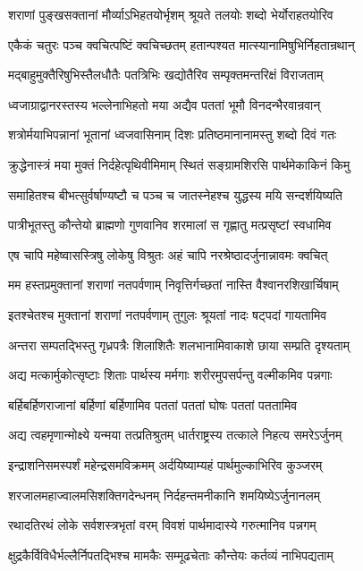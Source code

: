 \twolineshloka
{शराणां पुङ्खसक्तानां मौर्व्याऽभिहतयोर्भृशम्}
{श्रूयते तलयोः शब्दो भेर्योराहतयोरिव}


\twolineshloka
{एकैकं चतुरः पञ्च क्वचित्पष्टिं क्वचिच्छतम्}
{हतान्पश्यत मात्स्यानामिषुभिर्निहतान्रथान्}


\twolineshloka
{मद्बाहुमुक्तैरिषुभिस्तैलधौतैः पतत्रिभिः}
{खद्योतैरिव सम्पृक्तमन्तरिक्षं विराजताम्}


\twolineshloka
{ध्वजाग्राद्वानरस्तस्य भल्लेनाभिहतो मया}
{अद्यैव पततां भूमौ विनदन्भैरवान्रवान्}


\twolineshloka
{शत्रोर्मयाभिपन्नानां भूतानां ध्वजवासिनाम्}
{दिशः प्रतिष्ठमानानामस्तु शब्दो दिवं गतः}


\twolineshloka
{क्रुद्धेनास्त्रं मया मुक्तं निर्दहेत्पृथिवीमिमाम्}
{स्थितं सङ्ग्रामशिरसि पार्थमेकाकिनं किमु}


\twolineshloka
{समाहितश्च बीभत्सुर्वर्षाण्यष्टौ च पञ्च च}
{जातस्नेहश्च युद्धस्य मयि सन्दर्शयिष्यति}


\twolineshloka
{पात्रीभूतस्तु कौन्तेयो ब्राह्मणो गुणवानिव}
{शरमालां स गृह्णातु मत्प्रसृष्टां स्वधामिव}


\twolineshloka
{एष चापि महेष्वासस्त्रिषु लोकेषु विश्रुतः}
{अहं चापि नरश्रेष्ठादर्जुनान्नावमः क्वचित्}


\twolineshloka
{मम हस्तप्रमुक्तानां शराणां नतपर्वणाम्}
{निवृत्तिर्गच्छतां नास्ति वैश्वानरशिखार्चिषाम्}


\twolineshloka
{इतश्चेतश्च मुक्तानां शराणां नतपर्वणाम्}
{तुगुलः श्रूयतां नादः षट्पदां गायतामिव}


\twolineshloka
{अन्तरा सम्पतद्भिस्तु गृध्रपत्रैः शिलाशितैः}
{शलभानामिवाकाशे छाया सम्प्रति दृश्यताम्}


\twolineshloka
{अद्य मत्कार्मुकोत्सृष्टाः शिताः पार्थस्य मर्मगाः}
{शरीरमुपसर्पन्तु वल्मीकमिव पन्नगाः}


\twolineshloka
{बर्हिबर्हिणराजानां बर्हिणां बर्हिणामिव}
{पततां पततां घोषः पततां पततामिव}


\twolineshloka
{अद्य त्वहमृणान्मोक्ष्ये यन्मया तत्प्रतिश्रुतम्}
{धार्तराष्ट्रस्य तत्काले निहत्य समरेऽर्जुनम्}


\twolineshloka
{इन्द्राशनिसमस्पर्शं महेन्द्रसमविक्रमम्}
{अर्दयिष्याम्यहं पार्थमुल्काभिरिव कुञ्जरम्}


\twolineshloka
{शरजालमहाज्वालमसिशक्तिगदेन्धनम्}
{निर्दहन्तमनीकानि शमयिष्येऽर्जुनानलम्}


\twolineshloka
{रथादतिरथं लोके सर्वशस्त्रभृतां वरम्}
{विवशं पार्थमादास्ये गरुत्मानिव पन्नगम्}


\twolineshloka
{क्षुद्रकैर्विविधैर्भल्लैर्निपतद्भिश्च मामकैः}
{सम्मूढचेताः कौन्तेयः कर्तव्यं नाभिपद्यताम्}


